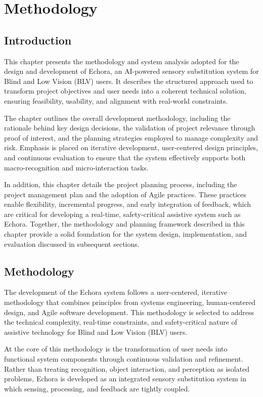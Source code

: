 \chapter{Methodology}
\label{ch:methodology}

\section{Introduction}

This chapter presents the methodology and system analysis adopted for the design and development of Echora, an AI-powered sensory substitution system for Blind and Low Vision (BLV) users. It describes the structured approach used to transform project objectives and user needs into a coherent technical solution, ensuring feasibility, usability, and alignment with real-world constraints.

The chapter outlines the overall development methodology, including the rationale behind key design decisions, the validation of project relevance through proof of interest, and the planning strategies employed to manage complexity and risk. Emphasis is placed on iterative development, user-centered design principles, and continuous evaluation to ensure that the system effectively supports both macro-recognition and micro-interaction tasks.

In addition, this chapter details the project planning process, including the project management plan and the adoption of Agile practices. These practices enable flexibility, incremental progress, and early integration of feedback, which are critical for developing a real-time, safety-critical assistive system such as Echora. Together, the methodology and planning framework described in this chapter provide a solid foundation for the system design, implementation, and evaluation discussed in subsequent sections.

\section{Methodology}

The development of the Echora system follows a user-centered, iterative methodology that combines principles from systems engineering, human-centered design, and Agile software development. This methodology is selected to address the technical complexity, real-time constraints, and safety-critical nature of assistive technology for Blind and Low Vision (BLV) users.

At the core of this methodology is the transformation of user needs into functional system components through continuous validation and refinement. Rather than treating recognition, object interaction, and perception as isolated problems, Echora is developed as an integrated sensory substitution system in which sensing, processing, and feedback are tightly coupled.

